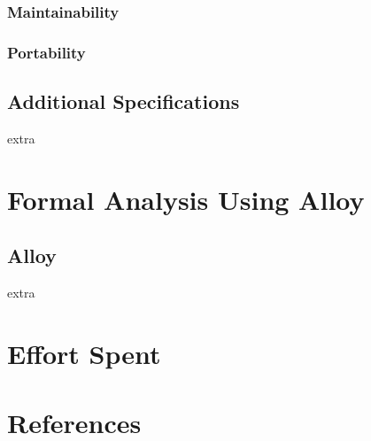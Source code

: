 \documentclass{article}
\begin{document}
		\subsubsection{Maintainability}
		\subsubsection{Portability}
	\subsection{Additional Specifications}
	extra
	
	
\section{Formal Analysis Using Alloy}
	\subsection{Alloy}
	extra
	
	
\section{Effort Spent}

\section{References}	
	
	
	
\end{document}

